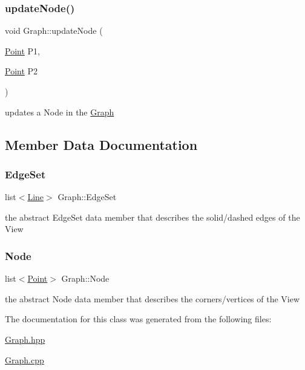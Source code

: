 \subsubsection{\texorpdfstring{update\+Node()}{updateNode()}}
{\footnotesize\ttfamily void Graph\+::update\+Node (\begin{DoxyParamCaption}\item[{\mbox{\hyperlink{class_point}{Point}}}]{P1,  }\item[{\mbox{\hyperlink{class_point}{Point}}}]{P2 }\end{DoxyParamCaption})}



updates a Node in the \mbox{\hyperlink{class_graph}{Graph}} 



\subsection{Member Data Documentation}
\mbox{\label{class_graph_aa8bbd434abc0c7a804ad7687b3ec2511}} 
\subsubsection{\texorpdfstring{Edge\+Set}{EdgeSet}}
{\footnotesize\ttfamily list$<$\mbox{\hyperlink{class_line}{Line}}$>$ Graph\+::\+Edge\+Set}



the abstract Edge\+Set data member that describes the solid/dashed edges of the View 

\mbox{\label{class_graph_abbffb935f6c2c6723a149d70bdb0762f}} 
\subsubsection{\texorpdfstring{Node}{Node}}
{\footnotesize\ttfamily list$<$\mbox{\hyperlink{class_point}{Point}}$>$ Graph\+::\+Node}



the abstract Node data member that describes the corners/vertices of the View 



The documentation for this class was generated from the following files\+:\begin{DoxyCompactItemize}
\item 
\mbox{\hyperlink{_graph_8hpp}{Graph.\+hpp}}\item 
\mbox{\hyperlink{_graph_8cpp}{Graph.\+cpp}}\end{DoxyCompactItemize}
